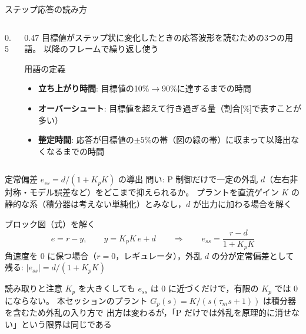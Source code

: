 \begin{frame}{ステップ応答の読み方\later}
  \begin{columns}[c]
    \begin{column}{0.5\textwidth}
      \centering
    \end{column}
    \begin{column}{0.47\textwidth}
      \footnotesize
      目標値がステップ状に変化したときの応答波形を読むための3つの用語。
      以降のフレームで繰り返し使う

      \begin{block}{用語の定義}\footnotesize
        \begin{itemize}\setlength{\itemsep}{0.4em}
          \item \textbf{立ち上がり時間}: 目標値の10\%$\to$90\%に達するまでの時間
          \item \textbf{オーバーシュート}: 目標値を超えて行き過ぎる量（割合[\%]で表すことが多い）
          \item \textbf{整定時間}: 応答が目標値の$\pm5\%$の帯（図の緑の帯）に収まって以降出なくなるまでの時間
        \end{itemize}
      \end{block}
    \end{column}
  \end{columns}
\end{frame}


\begin{frame}{定常偏差 $e_{ss} = d/(1+K_p K)$ の導出\later}
  \vspace{0.2em}
  {\footnotesize
  問い: P 制御だけで一定の外乱 $d$（左右非対称・モデル誤差など）をどこまで抑えられるか。
  プラントを直流ゲイン $K$ の静的な系（積分器は考えない単純化）とみなし，$d$ が出力に加わる場合を解く}

  \begin{block}{ブロック図（式）を解く}\footnotesize
    \setlength{\abovedisplayskip}{2pt}\setlength{\belowdisplayskip}{2pt}%
    \[
      e = r - y, \qquad y = K_p K \, e + d
      \qquad\Longrightarrow\qquad
      e_{ss} = \frac{r-d}{1+K_p K}
    \]
    角速度を 0 に保つ場合（$r=0$，レギュレータ），外乱 $d$ の分が定常偏差として残る: $|e_{ss}| = d/(1+K_p K)$
  \end{block}

  \begin{alertblock}{読み取りと注意}\footnotesize
    $K_p$ を大きくしても $e_{ss}$ は 0 に近づくだけで，有限の $K_p$ では 0 にならない。
    本セッションのプラント $G_p(s)=K/(s(\tau_m s+1))$ は積分器を含むため外乱の入り方で
    出方は変わるが，「P だけでは外乱を原理的に消せない」という限界は同じである
  \end{alertblock}
\end{frame}

